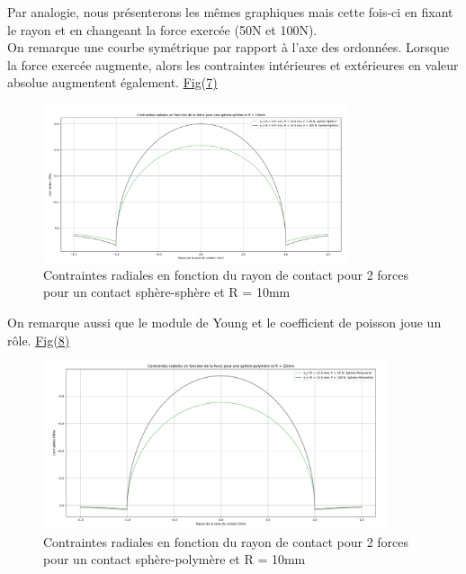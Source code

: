 \documentclass[a4paper,12pt]{article}
\begin{document}
Par analogie, nous présenterons les mêmes graphiques mais cette fois-ci en fixant le rayon et en changeant la force exercée (50N et 100N).\\
On remarque une courbe symétrique par rapport à l'axe des ordonnées. Lorsque la force exercée augmente, alors les contraintes intérieures et extérieures en valeur absolue augmentent également. \hyperref[fig:mon_image7]{Fig(7)}
\begin{figure}[H] %
	\centering
	\includegraphics[width=0.8\textwidth]{rad3.png} %
	\caption{Contraintes radiales en fonction du rayon de contact pour 2 forces pour un contact sphère-sphère et R = 10mm} %
	\label{fig:mon_image7} %
\end{figure}
On remarque aussi que le module de Young et le coefficient de poisson joue un rôle. \hyperref[fig:mon_image8]{Fig(8)}
\begin{figure}[H] %
	\centering
	\includegraphics[width=0.9\textwidth]{rad4.png} %
	\caption{Contraintes radiales en fonction du rayon de contact pour 2 forces pour un contact sphère-polymère et R = 10mm} %
	\label{fig:mon_image8} %
\end{figure}
\end{document}
